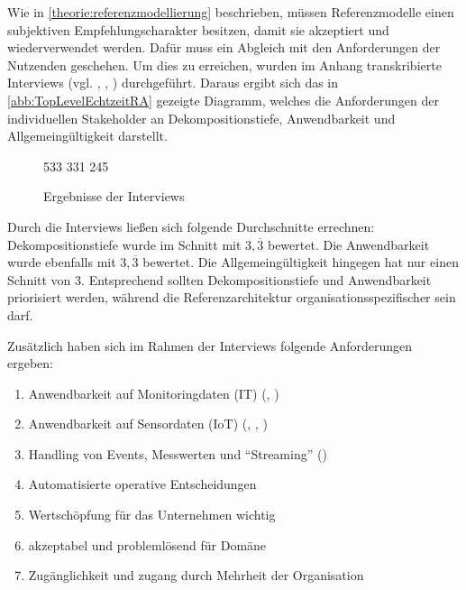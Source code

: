 Wie in \autoref{theorie:referenzmodellierung} beschrieben, müssen Referenzmodelle einen subjektiven Empfehlungscharakter besitzen, damit sie akzeptiert und wiederverwendet werden. Dafür muss ein Abgleich mit den Anforderungen der Nutzenden geschehen. Um dies zu erreichen, wurden im Anhang transkribierte Interviews (vgl. , , ) durchgeführt. Daraus ergibt sich das in \autoref{abb:TopLevelEchtzeitRA} gezeigte Diagramm, welches die Anforderungen der individuellen Stakeholder an Dekompositionstiefe, Anwendbarkeit und Allgemeingültigkeit darstellt.

\begin{figure}[H]
\centering
\spideroverview
{5}{3}{3}
{3}{3}{1}
{2}{4}{5}
\caption{Ergebnisse der Interviews}
\label{abb:DimensionenUebersicht}
\end{figure}
Durch die Interviews ließen sich folgende Durchschnitte errechnen: Dekompositionstiefe wurde im Schnitt mit $3,\overline{3}$ bewertet. Die Anwendbarkeit wurde ebenfalls mit $3,\overline{3}$ bewertet. Die Allgemeingültigkeit hingegen hat nur einen Schnitt von $3$. Entsprechend sollten Dekompositionstiefe und Anwendbarkeit priorisiert werden, während die Referenzarchitektur organisationsspezifischer sein darf. 

Zusätzlich haben sich im Rahmen der Interviews folgende Anforderungen ergeben:
\begin{enumerate}
\item Anwendbarkeit auf Monitoringdaten (IT) (, )
\item Anwendbarkeit auf Sensordaten (\ac{IoT}) (, , )
\item Handling von Events, Messwerten und \enquote{Streaming} ()
\item Automatisierte operative Entscheidungen
\item \label{anforderung:wertschöpfung} Wertschöpfung für das Unternehmen wichtig
\item \label{anforderung:akzeptabel} akzeptabel und problemlösend für Domäne
\item \label{anforderung:zugänglichkeit} Zugänglichkeit und zugang durch Mehrheit der Organisation
\end{enumerate}

